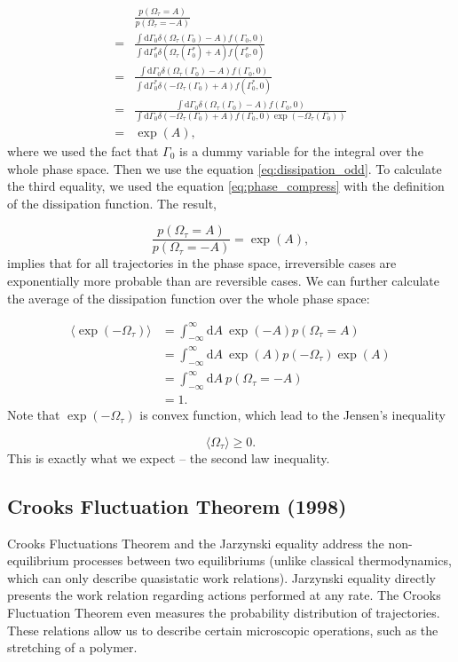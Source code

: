 \documentclass[ reprint, amsmath,amssymb, aps,]{revtex4-1}
\begin{document}
\begin{equation}
\begin{aligned}
&\frac{p(\Omega_\tau= A)}{p(\Omega_\tau= -A)}\\
=&\frac{\int\mathrm{d}\Gamma_0\delta(\Omega_\tau(\Gamma_0)-A)f(\Gamma_0,0)}{\int\mathrm{d}\Gamma_0^*\delta(\Omega_\tau(\Gamma_0^*)+A)f(\Gamma_0^*,0)}\\
=&\frac{\int\mathrm{d}\Gamma_0\delta(\Omega_\tau(\Gamma_0)-A)f(\Gamma_0,0)}{\int\mathrm{d}\Gamma_0^*\delta(-\Omega_\tau(\Gamma_0)+A)f(\Gamma_0^*
,0)}\\
=&\frac{\int\mathrm{d}\Gamma_0\delta(\Omega_\tau(\Gamma_0)-A)f(\Gamma_0,0)}{\int\mathrm{d}\Gamma_0\delta(-\Omega_\tau(\Gamma_0)+A)f(\Gamma_0,0)\exp(-{\Omega}_\tau(\Gamma_0))}\\
=&\exp(A),
\end{aligned}
\end{equation}
where we used the fact that $\Gamma_0$ is a dummy variable for the integral over the whole phase space. Then we use the equation \ref{eq:dissipation_odd}. To calculate the third equality, we used the equation \ref{eq:phase_compress} with the definition of the dissipation function. The result,

\begin{equation}
\frac{p(\Omega_\tau=A)}{p(\Omega_\tau=-A)}=\exp(A),
\end{equation}
implies that for all trajectories in the phase space, irreversible cases are exponentially more probable than are reversible cases. We can further calculate the average of the dissipation function over the whole phase space:

\[
 \begin{aligned}\label{eq:devESFT}
\langle \exp(-{\Omega}_\tau) \rangle
&=\int_{-\infty}^\infty \mathrm{d}A\ \exp(-A)p({\Omega}_\tau=A)\\
&=\int_{-\infty}^\infty \mathrm{d}A\  \exp(A)p(-{\Omega}_\tau)\exp(A)\\
&=\int_{-\infty}^\infty \mathrm{d}A\  p({\Omega}_\tau=-A)\\
&=1.
\end{aligned}
\]
Note that $\exp(-\Omega_\tau)$  is convex function, which lead to the Jensen's inequality

\begin{equation}
\langle \Omega_\tau\rangle \geq 0.
\end{equation}
This is exactly what we expect -- the second law inequality.

\subsection{Crooks Fluctuation Theorem (1998)}
Crooks Fluctuations Theorem and the Jarzynski equality address the non-equilibrium processes between two equilibriums (unlike classical thermodynamics, which can only describe quasistatic work relations). Jarzynski equality directly presents the work relation regarding actions performed at any rate. The Crooks Fluctuation Theorem even measures the probability distribution of trajectories. These relations allow us to describe certain microscopic operations, such as the stretching of a polymer.
\end{document}
